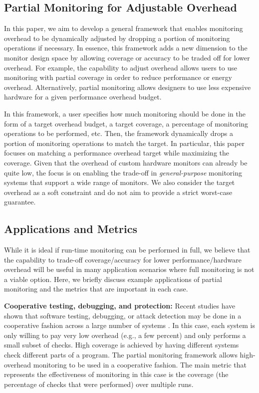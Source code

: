 \subsection{Partial Monitoring for Adjustable Overhead}

In this paper, we aim to develop a general framework that enables monitoring
overhead to be dynamically adjusted by dropping a portion of monitoring 
operations if necessary. In essence, this framework adds a new dimension to
the monitor design space by allowing coverage or accuracy to be traded off
for lower overhead. For example, the capability to adjust overhead allows users
to use monitoring with partial coverage in order to reduce performance
or energy overhead. Alternatively, partial monitoring allows designers to use
less expensive hardware for a given performance overhead budget.

In this framework, a user specifies how much monitoring should be done in the form of
a target 
overhead budget, a target coverage, a percentage of monitoring operations to be performed, etc.
Then, the framework dynamically drops a portion of monitoring operations to match
the target. In particular, this paper focuses on matching a performance overhead target
while maximizing the coverage. Given that the overhead of custom hardware monitors can
already be quite low, the focus is on enabling the trade-off in {\em general-purpose} 
monitoring systems that support a wide range of monitors.
We also consider the target overhead as a soft constraint and do not aim to
provide a strict worst-case guarantee.

\subsection{Applications and Metrics}

While it is ideal if run-time monitoring can be performed in full, we believe that
the capability to trade-off coverage/accuracy for lower performance/hardware overhead
will be useful in many application scenarios where full monitoring is not a viable option.
Here, we briefly discuss example applications of partial monitoring and the metrics
that are important in each case.

{\bf Cooperative testing, debugging, and protection:}
Recent studies have shown that software testing, debugging,
or attack detection may be done in a cooperative fashion across
a large number of systems \cite{liblit-pldi05, chilimbi-asplos04, greathouse-cgo11, testudo-micro08}. In this case, each system is only willing to pay very low
overhead (e.g., a few percent) and only performs a small subset of checks. 
High coverage is achieved by having different systems check different parts of a program.
The partial monitoring framework allows high-overhead monitoring to be used in a
cooperative fashion. 
The main metric that represents the effectiveness of monitoring in this case is
the coverage (the percentage of checks that were performed) over multiple runs.

